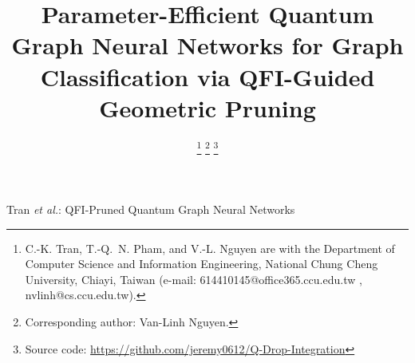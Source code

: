 \documentclass[journal]{IEEEtran}
\begin{document}
\title{Parameter-Efficient Quantum Graph Neural Networks for Graph Classification via QFI-Guided Geometric Pruning}

\author{%
  \thanks{C.-K. Tran, T.-Q.~N. Pham, and V.-L. Nguyen are with the Department
    of Computer Science and Information Engineering, National Chung Cheng
    University, Chiayi, Taiwan (e-mail: 614410145@office365.ccu.edu.tw , nvlinh@cs.ccu.edu.tw).}
  \thanks{Corresponding author: Van-Linh Nguyen.}
  \thanks{Source code: \url{https://github.com/jeremy0612/Q-Drop-Integration}}
}

%
{Tran \MakeLowercase{\textit{et al.}}: QFI-Pruned Quantum Graph Neural Networks}

\maketitle
\end{document}
